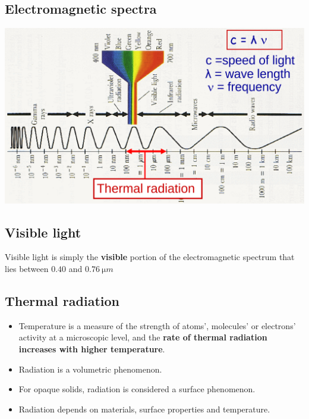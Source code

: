 \documentclass[11pt]{article}
\begin{document}
\subsection{Electromagnetic spectra}
\label{sec:org866a1b5}
\begin{center}
\includegraphics[width=.9\linewidth]{./images/electromagnetic-spectra.png}
\end{center}
\subsection{Visible light}
\label{sec:org16dcd0e}
Visible light is simply the \textbf{visible} portion of the electromagnetic spectrum that lies between \(0.40\) and \(\qty{0.76}{\micro m}\)

 \newpage
\subsection{Thermal radiation}
\label{sec:org2f1db7f}
\begin{itemize}
\item Temperature is a measure of the strength of atoms', molecules' or electrons' activity at a microscopic level, and the \textbf{rate of thermal radiation increases with higher temperature}.
\item Radiation is a volumetric phenomenon.
\item For opaque solids, radiation is considered a surface phenomenon.
\item Radiation depends on materials, surface properties and temperature.
\end{itemize}
\end{document}
